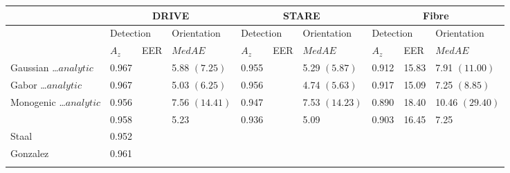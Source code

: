 \begin{tabularx}{\linewidth}{X X X X X X X X X X}

\toprule
    & \multicolumn{3}{c}{ DRIVE } & \multicolumn{3}{c}{ STARE } & \multicolumn{3}{c}{ Fibre } \\

\midrule
    & \multicolumn{2}{l}{ Detection } & Orientation
    & \multicolumn{2}{l}{ Detection } & Orientation
    & \multicolumn{2}{l}{ Detection } & Orientation \\

    & $A_z$    & EER  &   $MedAE$
    & $A_z$    & EER  &   $MedAE$
    & $A_z$    & EER  &   $MedAE$ \\

\midrule
Gaussian \newline \ldots $analytic$
    & 0.967    &    & 5.88 \newline $(7.25)$    & 0.955 &   & 5.29 \newline $(5.87)$ & 0.912    & 15.83 & 7.91 \newline $(11.00)$  \\

Gabor \newline \ldots $analytic$
    & 0.967    &    & 5.03 \newline $(6.25)$    & 0.956 &   & 4.74 \newline $(5.63)$ & 0.917    & 15.09 & 7.25 \newline $(8.85)$   \\

Monogenic \newline \ldots $analytic$
    & 0.956    &    & 7.56 \newline $(14.41)$   & 0.947 &   & 7.53 \newline $(14.23)$& 0.890    & 18.40 & 10.46 \newline $(29.40)$ \\

\dtcwt{}
    & 0.958    &    & 5.23                      & 0.936 &   & 5.09                   & 0.903    & 16.45 & 7.25                     \\



Staal
    & 0.952    &    &                           &       &   &                        &          &       &                           \\

Gonzalez
    & 0.961    &    &                           &       &   &                        &          &       &                           \\

\bottomrule
\noalign{\smallskip}
\end{tabularx}  